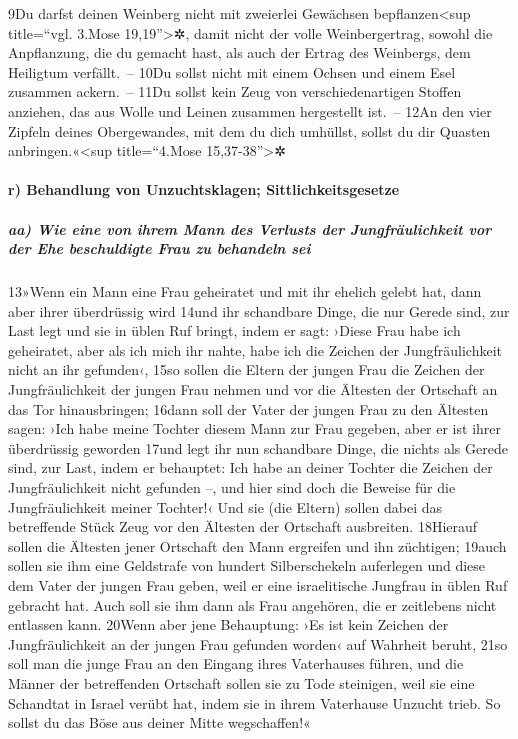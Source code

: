 9Du darfst deinen Weinberg nicht mit zweierlei Gewächsen
bepflanzen\textless sup title=``vgl. 3.Mose 19,19''\textgreater✲, damit
nicht der volle Weinbergertrag, sowohl die Anpflanzung, die du gemacht
hast, als auch der Ertrag des Weinbergs, dem Heiligtum verfällt.~-- 10Du
sollst nicht mit einem Ochsen und einem Esel zusammen ackern.~-- 11Du
sollst kein Zeug von verschiedenartigen Stoffen anziehen, das aus Wolle
und Leinen zusammen hergestellt ist.~-- 12An den vier Zipfeln deines
Obergewandes, mit dem du dich umhüllst, sollst du dir Quasten
anbringen.«\textless sup title=``4.Mose 15,37-38''\textgreater✲

\hypertarget{r-behandlung-von-unzuchtsklagen-sittlichkeitsgesetze}{%
\paragraph{r) Behandlung von Unzuchtsklagen;
Sittlichkeitsgesetze}\label{r-behandlung-von-unzuchtsklagen-sittlichkeitsgesetze}}

\hypertarget{aa-wie-eine-von-ihrem-mann-des-verlusts-der-jungfruxe4ulichkeit-vor-der-ehe-beschuldigte-frau-zu-behandeln-sei}{%
\subparagraph{aa) Wie eine von ihrem Mann des Verlusts der
Jungfräulichkeit vor der Ehe beschuldigte Frau zu behandeln
sei}\label{aa-wie-eine-von-ihrem-mann-des-verlusts-der-jungfruxe4ulichkeit-vor-der-ehe-beschuldigte-frau-zu-behandeln-sei}}

13»Wenn ein Mann eine Frau geheiratet und mit ihr ehelich gelebt hat,
dann aber ihrer überdrüssig wird 14und ihr schandbare Dinge, die nur
Gerede sind, zur Last legt und sie in üblen Ruf bringt, indem er sagt:
›Diese Frau habe ich geheiratet, aber als ich mich ihr nahte, habe ich
die Zeichen der Jungfräulichkeit nicht an ihr gefunden‹, 15so sollen die
Eltern der jungen Frau die Zeichen der Jungfräulichkeit der jungen Frau
nehmen und vor die Ältesten der Ortschaft an das Tor hinausbringen;
16dann soll der Vater der jungen Frau zu den Ältesten sagen: ›Ich habe
meine Tochter diesem Mann zur Frau gegeben, aber er ist ihrer
überdrüssig geworden 17und legt ihr nun schandbare Dinge, die nichts als
Gerede sind, zur Last, indem er behauptet: Ich habe an deiner Tochter
die Zeichen der Jungfräulichkeit nicht gefunden --, und hier sind doch
die Beweise für die Jungfräulichkeit meiner Tochter!‹ Und sie (die
Eltern) sollen dabei das betreffende Stück Zeug vor den Ältesten der
Ortschaft ausbreiten. 18Hierauf sollen die Ältesten jener Ortschaft den
Mann ergreifen und ihn züchtigen; 19auch sollen sie ihm eine Geldstrafe
von hundert Silberschekeln auferlegen und diese dem Vater der jungen
Frau geben, weil er eine israelitische Jungfrau in üblen Ruf gebracht
hat. Auch soll sie ihm dann als Frau angehören, die er zeitlebens nicht
entlassen kann. 20Wenn aber jene Behauptung: ›Es ist kein Zeichen der
Jungfräulichkeit an der jungen Frau gefunden worden‹ auf Wahrheit
beruht, 21so soll man die junge Frau an den Eingang ihres Vaterhauses
führen, und die Männer der betreffenden Ortschaft sollen sie zu Tode
steinigen, weil sie eine Schandtat in Israel verübt hat, indem sie in
ihrem Vaterhause Unzucht trieb. So sollst du das Böse aus deiner Mitte
wegschaffen!«

